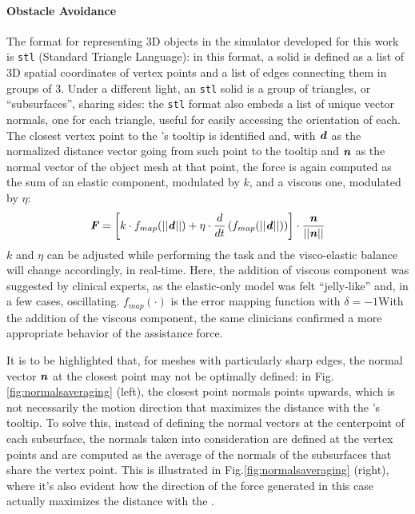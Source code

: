 \documentclass[../main.tex]{subfiles}
\begin{document}
\paragraph{Obstacle Avoidance} The format for representing 3D objects in the simulator developed for this work is \texttt{stl} (Standard Triangle Language): in this format, a solid is defined as a list of 3D spatial coordinates of vertex points and a list of edges connecting them in groups of 3. Under a different light, an \texttt{stl} solid is a group of triangles, or ``subsurfaces'', sharing sides: the \texttt{stl} format also embeds a list of unique vector normals, one for each triangle, useful for easily accessing the orientation of each. The closest vertex point to the \psm's tooltip is identified and, with $\textbf{\textit{d}}$ as the normalized distance vector going from such point to the tooltip and $\textbf{\textit{n}}$ as the normal vector of the object mesh at that point, the force is again computed as the sum of an elastic component, modulated by $k$, and a viscous one, modulated by $\eta$:
\begin{equation}
    \textbf{\textit{F}} = \left[k\cdot f_{map}(||\textbf{\textit{d}}||) + \eta\cdot \frac{d}{dt} \left( f_{map}(||\textbf{\textit{d}}||)\right)\right]\cdot \frac{\textbf{\textit{n}}}{||\textbf{\textit{n}}||} 
    \label{eq:obstacleavoidancef}
\end{equation}
$k$ and $\eta$ can be adjusted while performing the task and the visco-elastic balance will change accordingly, in real-time. Here, the addition of viscous component was suggested by clinical experts, as the elastic-only model was felt ``jelly-like'' and, in a few cases, oscillating. $f_{map}(\cdot)$ is the error mapping function with $\delta=-1$With the addition of the viscous component, the same clinicians confirmed a more appropriate behavior of the assistance force.



It is to be highlighted that, for meshes with particularly sharp edges, the normal vector $\textbf{\textit{n}}$ at the closest point may not be optimally defined: in Fig.\ref{fig:normalsaveraging} (left), the closest point normals points upwards, which is not necessarily the motion direction that maximizes the distance with the \psm's tooltip. To solve this, instead of defining the normal vectors at the centerpoint of each subsurface, the normals taken into consideration are defined at the vertex points and are computed as the average of the normals of the subsurfaces that share the vertex point. This is illustrated in Fig.\ref{fig:normalsaveraging} (right), where it's also evident how the direction of the force generated in this case actually maximizes the distance with the \ee.
\end{document}
